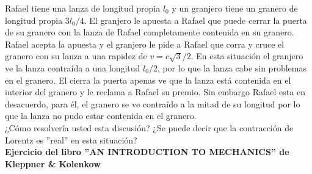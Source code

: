 \documentclass[12pt]{article}
\begin{document}
 Rafael tiene una lanza de longitud propia $l_0$ y  un granjero tiene un granero de longitud propia $3 l_0/4$. El granjero le apuesta a Rafael que puede cerrar la puerta de su granero con la lanza de Rafael completamente contenida en su granero. Rafael acepta la apuesta y el granjero le pide a Rafael que corra y  cruce el granero con su lanza a una rapidez de $v = c \sqrt{3}/2$. En esta situación el granjero ve la lanza contraída a una longitud $l_0/2$, por lo que la lanza cabe sin problemas en el granero. El cierra la puerta apenas ve que la lanza está contenida en el interior del granero y le reclama a Rafael su premio. Sin embargo Rafael esta en desacuerdo, para él, el granero se ve contraído a la mitad de su longitud por lo que la lanza no pudo estar contenida en el granero.\\
 
  
 ¿Cómo resolvería usted esta discusión? ¿Se puede decir que la contracción de Lorentz es ''real'' en esta situación?\\

\textbf{Ejercicio del libro ''AN INTRODUCTION TO MECHANICS'' de Kleppner \& Kolenkow}
\end{document}
